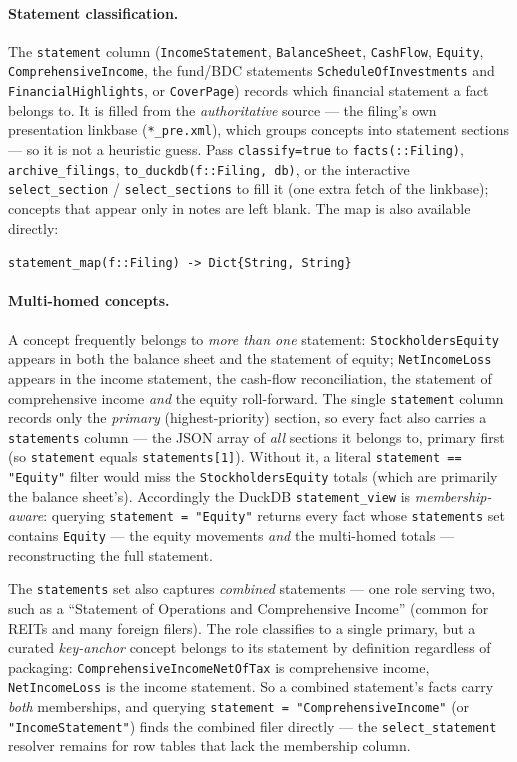 \documentclass[11pt,a4paper]{report}
\newcommand{\sig}[1]{\medskip\noindent\texttt{#1}\par\medskip}
\begin{document}
\paragraph{Statement classification.} The \texttt{statement} column (\texttt{IncomeStatement},
\texttt{BalanceSheet}, \texttt{CashFlow}, \texttt{Equity}, \texttt{ComprehensiveIncome}, the
fund/BDC statements \texttt{ScheduleOfInvestments} and \texttt{FinancialHighlights}, or
\texttt{CoverPage}) records which financial statement a fact belongs to. It is filled from the
\emph{authoritative} source --- the filing's own presentation linkbase (\texttt{*\_pre.xml}),
which groups concepts into statement sections --- so it is not a heuristic guess. Pass
\texttt{classify=true} to \texttt{facts(::Filing)}, \texttt{archive\_filings},
\texttt{to\_duckdb(f::Filing, db)}, or the interactive \texttt{select\_section} /
\texttt{select\_sections} to fill it (one extra fetch of the linkbase); concepts that
appear only in notes are left blank. The map is also available directly:

\sig{statement\_map(f::Filing) -> Dict\{String, String\}}

\paragraph{Multi-homed concepts.} A concept frequently belongs to \emph{more than one} statement:
\texttt{StockholdersEquity} appears in both the balance sheet and the statement of equity;
\texttt{NetIncomeLoss} appears in the income statement, the cash-flow reconciliation, the statement
of comprehensive income \emph{and} the equity roll-forward. The single \texttt{statement} column
records only the \emph{primary} (highest-priority) section, so every fact also carries a
\texttt{statements} column --- the JSON array of \emph{all} sections it belongs to, primary first (so
\texttt{statement} equals \texttt{statements[1]}). Without it, a literal \texttt{statement ==
"Equity"} filter would miss the \texttt{StockholdersEquity} totals (which are primarily the balance
sheet's). Accordingly the DuckDB \texttt{statement\_view} is \emph{membership-aware}: querying
\texttt{statement = "Equity"} returns every fact whose \texttt{statements} set contains \texttt{Equity}
--- the equity movements \emph{and} the multi-homed totals --- reconstructing the full statement.

The \texttt{statements} set also captures \emph{combined} statements --- one role serving two, such as
a ``Statement of Operations and Comprehensive Income'' (common for REITs and many foreign filers).
The role classifies to a single primary, but a curated \emph{key-anchor} concept belongs to its
statement by definition regardless of packaging: \texttt{ComprehensiveIncomeNetOfTax} is comprehensive
income, \texttt{NetIncomeLoss} is the income statement. So a combined statement's facts carry
\emph{both} memberships, and querying \texttt{statement = "ComprehensiveIncome"} (or
\texttt{"IncomeStatement"}) finds the combined filer directly --- the \texttt{select\_statement}
resolver remains for row tables that lack the membership column.
\end{document}
